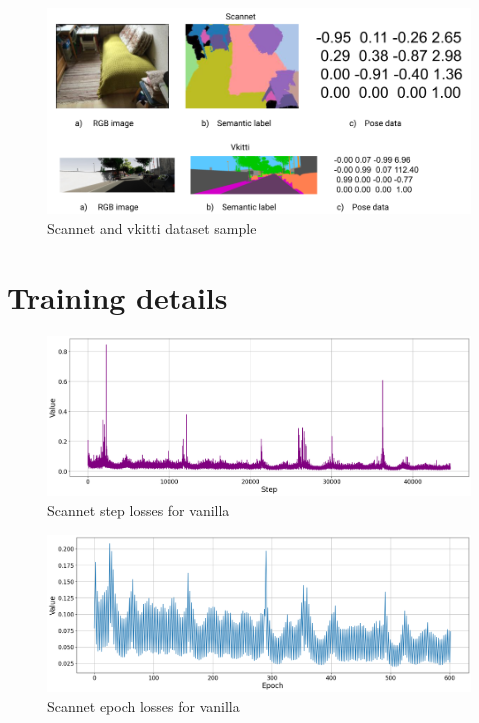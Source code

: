 	\begin{figure}
		\centering
		\includegraphics[width=13cm]{images/dataset.png}
		\caption{Scannet and vkitti dataset sample}
		\label{fig:android_result}
	\end{figure}

	\chapter{Training details}
	
	\begin{figure}
		\centering
		\includegraphics[width=13cm]{images/scannet_step_vanilla_all.png}
		\caption{Scannet step losses for vanilla}
		\label{fig:android_result}
	\end{figure}

	\begin{figure}
		\centering
		\includegraphics[width=13cm]{images/scannet_epoch_vanilla_all.png}
		\caption{Scannet epoch losses for vanilla}
		\label{fig:android_result}
	\end{figure}

